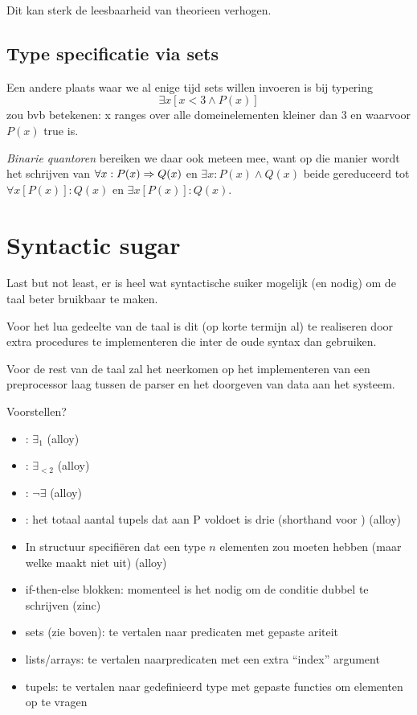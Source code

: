 \documentclass{article}
\begin{document}
Dit kan sterk de leesbaarheid van theorieen verhogen.

\subsection{Type specificatie via sets}
Een andere plaats waar we al enige tijd sets willen invoeren is bij typering
\[\exists x[x<3 \land P(x)]\] zou bvb betekenen: x ranges over alle domeinelementen kleiner dan 3 en waarvoor $P(x)$ true is.

\emph{Binarie quantoren} bereiken we daar ook meteen mee, want op die manier wordt het schrijven van $\forall x: P(x) \Rightarrow Q(x)$ en $\exists x: P(x) \land Q(x)$ beide gereduceerd tot $\forall x[P(x)]: Q(x)$ en $\exists x[P(x)]: Q(x)$.



\section{Syntactic sugar}
Last but not least, er is heel wat syntactische suiker mogelijk (en nodig) om de taal beter bruikbaar te maken.

Voor het lua gedeelte van de taal is dit (op korte termijn al) te realiseren door extra procedures te implementeren die inter de oude syntax dan gebruiken.

Voor de rest van de taal zal het neerkomen op het implementeren van een preprocessor laag tussen de parser en het doorgeven van data aan het systeem.

Voorstellen?
\begin{itemize}
  \item {}: $\exists_1$ (alloy)
  \item {}: $\exists_{<2}$ (alloy)
  \item {}: $\lnot \exists$ (alloy)
  \item {}: het totaal aantal tupels dat aan P voldoet is drie (shorthand voor ) (alloy)
  \item In structuur specifi\"eren dat een type $n$ elementen zou moeten hebben (maar welke maakt niet uit) (alloy)
  \item if-then-else blokken: momenteel is het nodig om de conditie dubbel te schrijven (zinc)
  \item sets (zie boven): te vertalen naar predicaten met gepaste ariteit
  \item lists/arrays: te vertalen naarpredicaten met een extra ``index'' argument
  \item tupels: te vertalen naar gedefinieerd type met gepaste functies om elementen op te vragen
\end{itemize}
\end{document}
